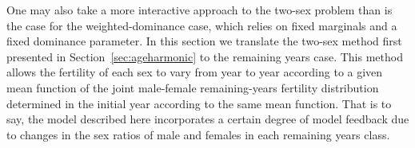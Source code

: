 \label{sec:ex2sexschoen}
One may also take a more interactive approach to the two-sex
problem than is the case for the weighted-dominance case, which relies
on fixed marginals and a fixed dominance parameter. In this section we
translate the two-sex method first presented in Section~\ref{sec:ageharmonic}
to the remaining years case. This method allows the fertility of each sex to
vary from year to year according to a given mean function of the joint male-female remaining-years 
fertility distribution determined in the initial year according to the same
mean function. That is to say, the model described here incorporates a certain
degree of model feedback due to changes in the sex ratios of male and females in
each remaining years class.


